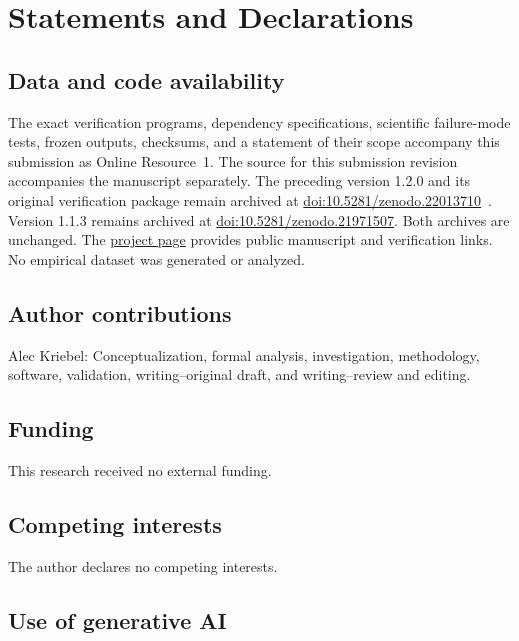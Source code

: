 \documentclass[11pt]{article}
\theoremstyle{remark}
\begin{document}
\section*{Statements and Declarations}

\subsection*{Data and code availability}

The exact verification programs, dependency specifications, scientific
failure-mode tests, frozen outputs, checksums, and a statement of their scope
accompany this submission as Online Resource~1.  The source for this
submission revision accompanies the manuscript separately.  The preceding
version 1.2.0 and its original verification package remain archived at
\href{https://doi.org/10.5281/zenodo.22013710}
{doi:10.5281/zenodo.22013710}~\cite{Kriebel2026Zenodo}.
Version 1.1.3 remains archived at
\href{https://doi.org/10.5281/zenodo.21971507}
{doi:10.5281/zenodo.21971507}.  Both archives are unchanged.
The \href{https://aleckriebel.github.io/Math/papers/exceptional-ybe-d4/}
{project page} provides public manuscript and verification links.  No
empirical dataset was generated or analyzed.

\subsection*{Author contributions}

Alec Kriebel: Conceptualization, formal analysis, investigation, methodology,
software, validation, writing--original draft, and writing--review and editing.

\subsection*{Funding}

This research received no external funding.

\subsection*{Competing interests}

The author declares no competing interests.

\subsection*{Use of generative AI}
\end{document}
